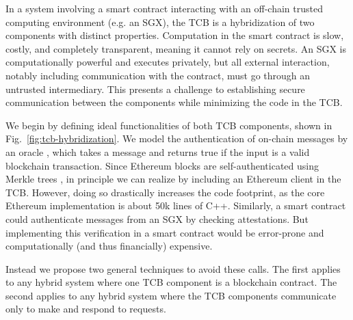 In a system involving a smart contract interacting with an off-chain trusted computing environment (e.g. an SGX),
the TCB is a hybridization of two components with distinct properties.
Computation in the smart contract is slow, costly, and completely transparent, meaning it cannot rely on secrets.
An SGX is computationally powerful and executes privately, but all external interaction, notably including communication with the contract, must go through an untrusted intermediary.
This presents a challenge to establishing secure communication between the components while minimizing the code in the TCB.


We begin by defining ideal functionalities of both TCB components, shown in Fig.~\ref{fig:tcb-hybridization}.
We model the authentication of on-chain messages by an oracle \oauth, which takes a message and returns true if the input is a valid blockchain transaction.
Since Ethereum blocks are self-authenticated using Merkle trees \cite{whitepaper,yellowpaper},
in principle we can realize \oauth by including an Ethereum client in the TCB.
However, doing so drastically increases the code footprint, as the core Ethereum implementation is about 50k lines of C++.
Similarly, a smart contract could authenticate messages from an SGX by checking attestations.
But implementing this verification in a smart contract would be error-prone and computationally (and thus financially) expensive.

Instead we propose two general techniques to avoid these calls.
The first applies to any hybrid system where one TCB component is a blockchain contract.
The second applies to any hybrid system where the TCB components communicate only to make and respond to requests.

